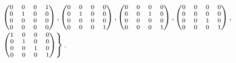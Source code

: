 \documentclass[11pt]{article}
\begin{document}
         \vspace{-2mm}               
$ \hspace{13mm}  \scriptsize{        \begin{pmatrix}
                        0&0&0&1\\
                        0&1&0&0\\
                        0&0&0&0\\
                        0&0&0&0\\
                        \end{pmatrix},
                      \begin{pmatrix}
                        0&0&0&0\\
                        0&1&0&0\\
                        0&0&0&0\\
                        0&0&0&1\\
                        \end{pmatrix},
                        \begin{pmatrix}
                        0&0&0&0\\
                        0&0&1&0\\
                        0&0&0&0\\
                        0&0&0&1\\
                        \end{pmatrix},
                        \begin{pmatrix}
                        0&0&0&0\\
                        0&0&0&0\\
                        0&0&1&0\\
                        0&0&0&1\\
                        \end{pmatrix},}$\\[4pt]
                        
                \vspace{-2mm}        
$\hspace{13mm}\left. \scriptsize{          \begin{pmatrix}
                        1&0&0&0\\
                        0&1&0&0\\
                        0&0&1&0\\
                        0&0&0&1\\
                        \end{pmatrix}   }   
    \right\}.$ 
\end{document}
